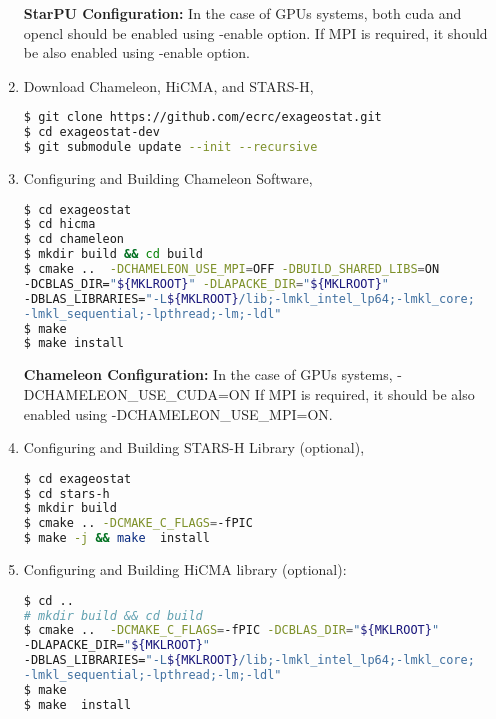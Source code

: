 \documentclass[
10pt, %
a4paper, %
oneside, %
headinclude,footinclude, %
BCOR5mm, %
]{scrartcl}
\begin{document}
\begin{enumerate}
\begin{shaded}
{\textbf {StarPU Configuration:}} In the case of GPUs systems, both cuda and opencl should be enabled using -enable option.
If MPI is required, it should be also enabled using -enable option.
\end{shaded}


\item
\noindent Download Chameleon, HiCMA, and STARS-H,
\begin{lstlisting}[language=bash]
$ git clone https://github.com/ecrc/exageostat.git
$ cd exageostat-dev
$ git submodule update --init --recursive
\end{lstlisting}

\item
\noindent Configuring and Building Chameleon Software,
\begin{lstlisting}[language=bash]
$ cd exageostat
$ cd hicma
$ cd chameleon
$ mkdir build && cd build
$ cmake ..  -DCHAMELEON_USE_MPI=OFF -DBUILD_SHARED_LIBS=ON 
-DCBLAS_DIR="${MKLROOT}" -DLAPACKE_DIR="${MKLROOT}"
-DBLAS_LIBRARIES="-L${MKLROOT}/lib;-lmkl_intel_lp64;-lmkl_core; 
-lmkl_sequential;-lpthread;-lm;-ldl"
$ make 
$ make install
\end{lstlisting}

\begin{shaded}
{\textbf {Chameleon Configuration:}} In the case of GPUs systems,  -DCHAMELEON\_USE\_CUDA=ON
If MPI is required, it should be also enabled using -DCHAMELEON\_USE\_MPI=ON.
\end{shaded}

\item
\noindent Configuring and Building STARS-H Library (optional),
\begin{lstlisting}[language=bash]
$ cd exageostat
$ cd stars-h
$ mkdir build 
$ cmake .. -DCMAKE_C_FLAGS=-fPIC 
$ make -j && make  install
\end{lstlisting}



\item
\noindent Configuring and Building HiCMA library (optional):
\begin{lstlisting}[language=bash]
$ cd ..
# mkdir build && cd build
$ cmake ..  -DCMAKE_C_FLAGS=-fPIC -DCBLAS_DIR="${MKLROOT}" 
-DLAPACKE_DIR="${MKLROOT}"
-DBLAS_LIBRARIES="-L${MKLROOT}/lib;-lmkl_intel_lp64;-lmkl_core;
-lmkl_sequential;-lpthread;-lm;-ldl"
$ make 
$ make  install
\end{lstlisting}
\end{enumerate}
\end{document}
